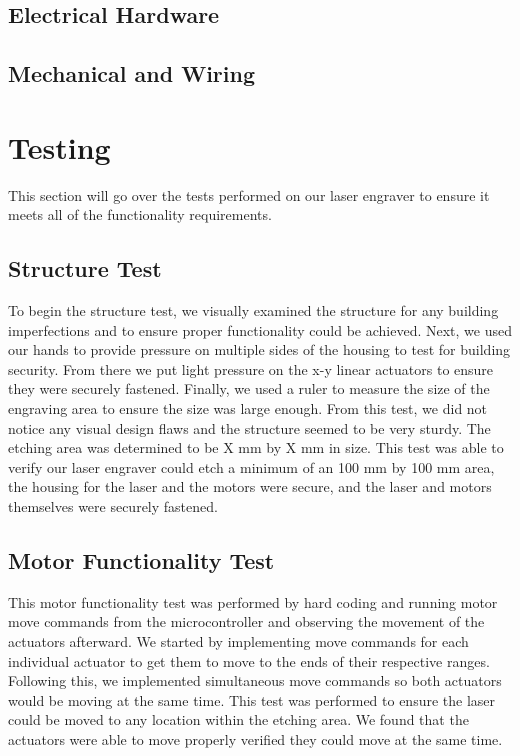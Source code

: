 \documentclass[11pt]{LaTeX-Classes/math-hw}
\begin{document}
\subsection{Electrical Hardware}

\subsection{Mechanical and Wiring}

\section{Testing}
This section will go over the tests performed on our laser engraver to ensure it meets all of the functionality requirements. 

\subsection{Structure Test}
To begin the structure test, we visually examined the structure for any building imperfections and to ensure proper functionality could be achieved. Next, we used our hands to provide pressure on multiple sides of the housing to test for building security. From there we put light pressure on the x-y linear actuators to ensure they were securely fastened. Finally, we used a ruler to measure the size of the engraving area to ensure the size was large enough. From this test, we did not notice any visual design flaws and the structure seemed to be very sturdy. The etching area was determined to be X mm by X mm in size. This test was able to verify our laser engraver could etch a minimum of an 100 mm by 100 mm area, the housing for the laser and the motors were secure, and the laser and motors themselves were securely fastened.

\subsection{Motor Functionality Test}
This motor functionality test was performed by hard coding and running motor move commands from the microcontroller and observing the movement of the actuators afterward. We started by implementing move commands for each individual actuator to get them to move to the ends of their respective ranges. Following this, we implemented simultaneous move commands so both actuators would be moving at the same time. This test was performed to ensure the laser could be moved to any location within the etching area. We found that the actuators were able to move properly verified they could move at the same time. 
\end{document}
